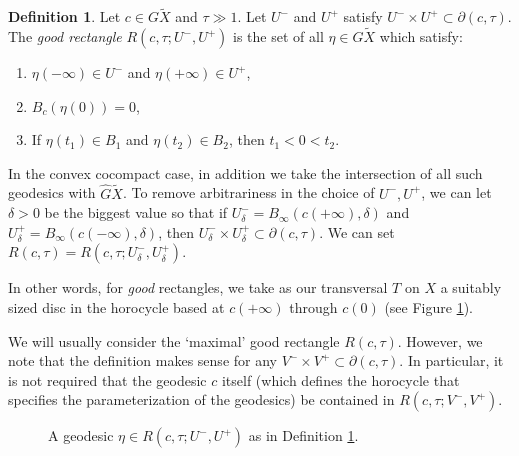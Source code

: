 \documentclass[11pt]{article}
\theoremstyle{definition}
\newtheorem{defn}[thm]{Definition}
\numberwithin{equation}{section}
\begin{document}
\begin{defn}\label{def:good rectangle}
Let $c\in G\tilde X$ and $\tau \gg 1$. Let $U^-$ and $U^+$ satisfy $U^- \times U^+ \subset \partial (c, \tau)$. The \emph{good rectangle} $R(c, \tau; U^-, U^+)$ is the set of all $\eta \in G \tilde X$ which satisfy:
\begin{enumerate}
\item $\eta(-\infty) \in U^-$ and $\eta(+\infty) \in U^+$,
\item $B_{c}(\eta(0)) = 0$,
\item If $\eta(t_1)\in B_1$ and $\eta(t_2)\in B_2$, then $t_1<0<t_2$.
\end{enumerate}
In the convex cocompact case, in addition we take the intersection of all such geodesics with $\hat G\tilde X$. To remove arbitrariness in the choice of $U^-, U^+$, we can let $\delta>0$ be the biggest value so that if $U^-_\delta = B_\infty(c(+\infty), \delta)$ and $U^+_\delta = B_\infty(c(-\infty), \delta)$, then $U^-_\delta \times U^+_\delta \subset \partial(c, \tau)$. We can set $R(c, \tau)= R(c, \tau; U^-_\delta, U^+_\delta)$.
\end{defn}

In other words, for \emph{good} rectangles, we take as our transversal $T$ on $X$ a suitably sized disc in the horocycle based at $c(+\infty)$ through $c(0)$ (see Figure \ref{fig:good rectangle}).

We will usually consider the `maximal' good rectangle $R(c, \tau)$. However, we note that the definition makes sense for any $V^- \times V^+ \subset \partial (c, \tau)$. In particular, it is not required that the geodesic $c$ itself (which defines the horocycle that specifies the parameterization of the geodesics) be contained in $R(c, \tau; V^-, V^+)$.

\begin{figure}[htb]
\caption{A geodesic $\eta\in R(c, \tau ; U^-,U^+)$ as in Definition \ref{def:good rectangle}.}\label{fig:good rectangle}
\end{figure}
\end{document}
